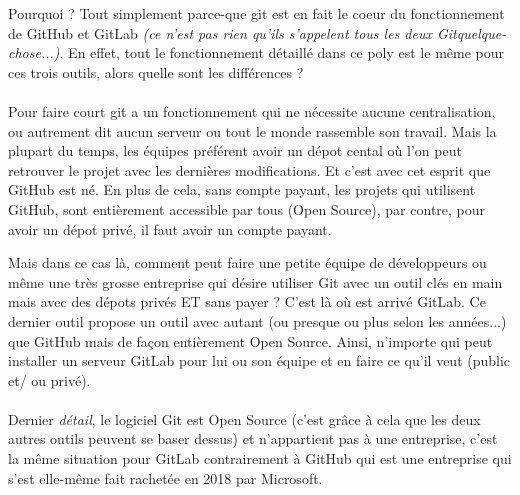 \documentclass[french, a4paper, 12pt, titlepage]{article}
\begin{document}
Pourquoi ? Tout simplement parce-que git est en fait le coeur du fonctionnement de GitHub et GitLab \emph{(ce n'est pas rien qu'ils s'appelent tous les deux Gitquelque-chose...)}. En effet, tout le fonctionnement détaillé dans ce poly est le même pour ces trois outils, alors quelle sont les différences ?

\paragraph{}Pour faire court git a un fonctionnement qui ne nécessite aucune centralisation, ou autrement dit aucun serveur ou tout le monde rassemble son travail. Mais la plupart du temps, les équipes préférent avoir un dépot cental où l'on peut retrouver le projet avec les dernières modifications. Et c'est avec cet esprit que GitHub est né. En plus de cela, sans compte payant, les projets qui utilisent GitHub, sont entièrement accessible par tous (Open Source), par contre, pour avoir un dépot privé, il faut avoir un compte payant.

Mais dans ce cas là, comment peut faire une petite équipe de développeurs ou même une très grosse entreprise qui désire utiliser Git avec un outil clés en main mais avec des dépots privés ET sans payer ? C'est là où est arrivé GitLab. Ce dernier outil propose un outil avec autant (ou presque ou plus selon les années...) que GitHub mais de façon entièrement Open Source. Ainsi, n'importe qui peut installer un serveur GitLab pour lui ou son équipe et en faire ce qu'il veut (public et/ ou privé).

\paragraph{}Dernier \emph{détail}, le logiciel Git est Open Source (c'est grâce à cela que les deux autres outils peuvent se baser dessus) et n'appartient pas à une entreprise, c'est la même situation pour GitLab contrairement à GitHub qui est une entreprise qui s'est elle-même fait rachetée en 2018 par Microsoft.
\end{document}
